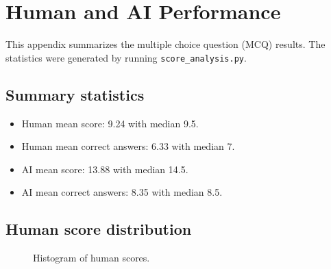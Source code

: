 
\section*{Human and AI Performance}
This appendix summarizes the multiple choice question (MCQ) results.
The statistics were generated by running \texttt{score\_analysis.py}.

\subsection*{Summary statistics}
\begin{itemize}
  \item Human mean score: 9.24 with median 9.5.
  \item Human mean correct answers: 6.33 with median 7.
  \item AI mean score: 13.88 with median 14.5.
  \item AI mean correct answers: 8.35 with median 8.5.
\end{itemize}

\subsection*{Human score distribution}
\begin{figure}[h]
  \centering
  \caption{Histogram of human scores.}
\end{figure}

